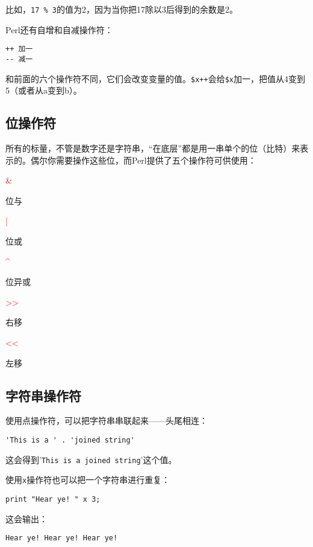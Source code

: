 比如，\verb|17 % 3|的值为2，因为当你把17除以3后得到的余数是2。

Perl还有自增和自减操作符：

\begin{lstlisting}
++ 加一
-- 减一
\end{lstlisting}

和前面的六个操作符不同，它们会改变变量的值。\verb|$x++|会给\verb|$x|加一，把值从4变到5（或者从a变到b）。

\subsection{位操作符}
所有的标量，不管是数字还是字符串，“在底层”都是用一串单个的位（比特）来表示的。偶尔你需要操作这些位，而Perl提供了五个操作符可供使用：

\noindent
\textcolor{red}{\&}
\begin{adjustwidth}{4em}{}
位与
\end{adjustwidth}
\textcolor{red}{|}
\begin{adjustwidth}{4em}{}
位或
\end{adjustwidth}
\textcolor{red}{\^{}}
\begin{adjustwidth}{4em}{}
位异或
\end{adjustwidth}
\textcolor{red}{\textgreater\textgreater}
\begin{adjustwidth}{4em}{}
右移
\end{adjustwidth}
\textcolor{red}{\textless\textless}
\begin{adjustwidth}{4em}{}
左移
\end{adjustwidth}

\subsection{字符串操作符}
使用点操作符，可以把字符串串联起来——头尾相连：

\begin{lstlisting}
'This is a ' . 'joined string'
\end{lstlisting}

这会得到'\verb|This is a joined string|'这个值。

使用\verb|x|操作符也可以把一个字符串进行重复：

\begin{lstlisting}
print "Hear ye! " x 3;
\end{lstlisting}

这会输出：

\begin{lstlisting}
Hear ye! Hear ye! Hear ye!
\end{lstlisting}

